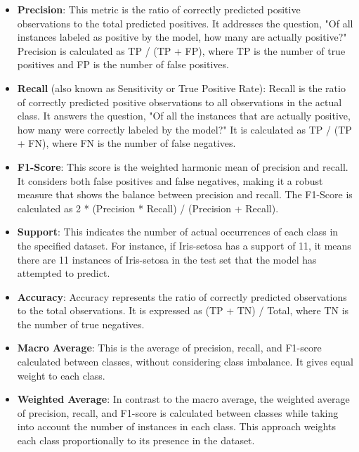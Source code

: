\begin{itemize}
	\item \textbf{Precision}: This metric is the ratio of correctly predicted positive observations to the total predicted positives. It addresses the question, "Of all instances labeled as positive by the model, how many are actually positive?" Precision is calculated as TP / (TP + FP), where TP is the number of true positives and FP is the number of false positives.
	
	\item \textbf{Recall} (also known as Sensitivity or True Positive Rate): Recall is the ratio of correctly predicted positive observations to all observations in the actual class. It answers the question, "Of all the instances that are actually positive, how many were correctly labeled by the model?" It is calculated as TP / (TP + FN), where FN is the number of false negatives.
	
	\item \textbf{F1-Score}: This score is the weighted harmonic mean of precision and recall. It considers both false positives and false negatives, making it a robust measure that shows the balance between precision and recall. The F1-Score is calculated as 2 * (Precision * Recall) / (Precision + Recall).
	
	\item \textbf{Support}: This indicates the number of actual occurrences of each class in the specified dataset. For instance, if Iris-setosa has a support of 11, it means there are 11 instances of Iris-setosa in the test set that the model has attempted to predict.
	
	\item \textbf{Accuracy}: Accuracy represents the ratio of correctly predicted observations to the total observations. It is expressed as (TP + TN) / Total, where TN is the number of true negatives.
	
	\item \textbf{Macro Average}: This is the average of precision, recall, and F1-score calculated between classes, without considering class imbalance. It gives equal weight to each class.
	
	\item \textbf{Weighted Average}: In contrast to the macro average, the weighted average of precision, recall, and F1-score is calculated between classes while taking into account the number of instances in each class. This approach weights each class proportionally to its presence in the dataset.
\end{itemize}
